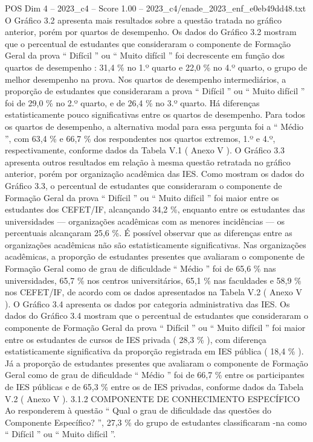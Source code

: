 \begin{textsample}{POS Dim 4 – 2023\_c4 – Score 1.00 – 2023\_c4/enade\_2023\_enf\_e0eb49dd48.txt}
O Gráfico 3.2 apresenta mais resultados sobre a questão tratada no gráfico anterior, porém por quartos de desempenho.
Os dados do Gráfico 3.2 mostram que o percentual de estudantes que consideraram o componente de Formação Geral da prova “ Difícil ” ou “ Muito difícil ” foi decrescente em função dos quartos de desempenho : 31,4 \% no 1.º quarto e 22,0 \% no 4.º quarto, o grupo de melhor desempenho na prova.
Nos quartos de desempenho intermediários, a proporção de estudantes que consideraram a prova “ Difícil ” ou “ Muito difícil ” foi de 29,0 \% no 2.º quarto, e de 26,4 \% no 3.º quarto.
Há diferenças estatisticamente pouco significativas entre os quartos de desempenho.
Para todos os quartos de desempenho, a alternativa modal para essa pergunta foi a “ Médio ”, com 63,4 \% e 66,7 \% dos respondentes nos quartos extremos, 1.º e 4.º, respectivamente, conforme dados da Tabela V.1 ( Anexo V ).
O Gráfico 3.3 apresenta outros resultados em relação à mesma questão retratada no gráfico anterior, porém por organização acadêmica das IES.
Como mostram os dados do Gráfico 3.3, o percentual de estudantes que consideraram o componente de Formação Geral da prova “ Difícil ” ou “ Muito difícil ” foi maior entre os estudantes dos CEFET/IF, alcançando 34,2 \%, enquanto entre os estudantes das universidades — organizações acadêmicas com as menores incidências — os percentuais alcançaram 25,6 \%.
É possível observar que as diferenças entre as organizações acadêmicas não são estatisticamente significativas.
Nas organizações acadêmicas, a proporção de estudantes presentes que avaliaram o componente de Formação Geral como de grau de dificuldade “ Médio ” foi de 65,6 \% nas universidades, 65,7 \% nos centros universitários, 65,1 \% nas faculdades e 58,9 \% nos CEFET/IF, de acordo com os dados apresentados na Tabela V.2 ( Anexo V ).
O Gráfico 3.4 apresenta os dados por categoria administrativa das IES.
Os dados do Gráfico 3.4 mostram que o percentual de estudantes que consideraram o componente de Formação Geral da prova “ Difícil ” ou “ Muito difícil ” foi maior entre os estudantes de cursos de IES privada ( 28,3 \% ), com diferença estatisticamente significativa da proporção registrada em IES pública ( 18,4 \% ).
Já a proporção de estudantes presentes que avaliaram o componente de Formação Geral como de grau de dificuldade “ Médio ” foi de 66,7 \% entre os participantes de IES públicas e de 65,3 \% entre os de IES privadas, conforme dados da Tabela V.2 ( Anexo V ). 3.1.2 COMPONENTE DE CONHECIMENTO ESPECÍFICO Ao responderem à questão “ Qual o grau de dificuldade das questões do Componente Específico? ”, 27,3 \% do grupo de estudantes classificaram -na como “ Difícil ” ou “ Muito difícil ”.

\end{textsample}
